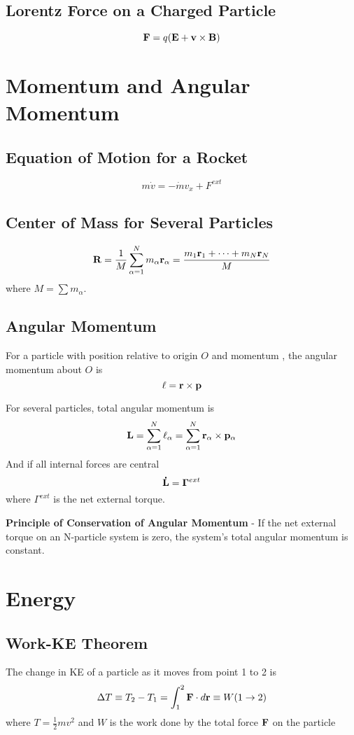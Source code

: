 \documentclass{article}
\begin{document}
\subsection{Lorentz Force on a Charged Particle}
$$
\vb{F} = q(\vb{E} + \vb{v} \times \vb{B})
$$

\section{Momentum and Angular Momentum}
\subsection{Equation of Motion for a Rocket}
$$
m\dot{v} = -\dot{m}v_{x} + F^{ext}
$$
\subsection{Center of Mass for Several Particles}
$$
\vb{R} = \frac{1}{M}\sum_{\alpha=1}^{N} m_{\alpha}\vb{r}_{\alpha} = \frac{m_1 \vb{r}_1 + \dots + m_N \vb{r}_N}{M}
$$
where $M = \sum m_{\alpha}$.
\subsection{Angular Momentum}
For a particle with position  relative to origin $O$ and momentum , the angular momentum about $O$ is
$$ \vb{\ell} = \vb{r} \times \vb{p} $$

For several particles, total angular momentum is
$$
\vb{L} = \sum_{\alpha=1}^{N} \vb{\ell}_{\alpha} = \sum_{\alpha=1}^{N} \vb{r}_{\alpha} \times \vb{p}_{\alpha}
$$
And if all internal forces are central
$$\vb{\dot{L}} = \vb{\Gamma}^{ext}$$
where $\Gamma^{ext}$ is the net external torque.

\textbf{Principle of Conservation of Angular Momentum} - If the net external torque on an N-particle system is zero, the system's total angular momentum is constant.

\section{Energy}
\subsection{Work-KE Theorem}
The change in KE of a particle as it moves from point 1 to 2 is
$$
\Delta T \equiv T_{2} - T_{1} = \int_{1}^{2} \vb{F} \cdot d\vb{r} \equiv W(1 \to 2)
$$
where $T = \frac{1}{2}mv^2$ and $W$ is the work done by the total force $\vb{F}$ on the particle
\end{document}
